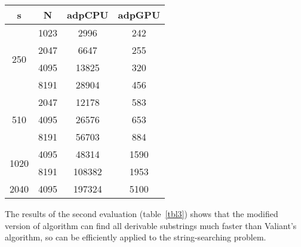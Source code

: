\begin{table*}

\begin{center}
\caption{The string-searching problem}
\label{tbl3}
    \begin{tabular}{ ||c||c||c|c|| } 
    \hline
    s & N & adpCPU &  adpGPU \\
    \hline
    \multirow{4}{2em}{250} & 1023 & 2996 & 242 \\ 
    & 2047 & 6647 & 255\\ 
    & 4095 & 13825 & 320\\ 
    & 8191 & 28904 & 456\\ 
    \hline
    \multirow{3}{2em}{510} & 2047 & 12178 & 583\\
    & 4095 & 26576 & 653\\
    & 8191 & 56703 & 884\\ 
    \hline
    \multirow{2}{2em}{1020} & 4095 & 48314 & 1590 \\
    & 8191 & 108382 & 1953\\ 
    \hline
    2040 & 4095 & 197324 & 5100\\ 
    \hline
    \end{tabular}
\end{center}

\end{table*}

The results of the second evaluation (table~\ref{tbl3}) shows that the modified version of algorithm can find all derivable substrings much faster than Valiant's algorithm, so can be efficiently applied to the string-searching problem.